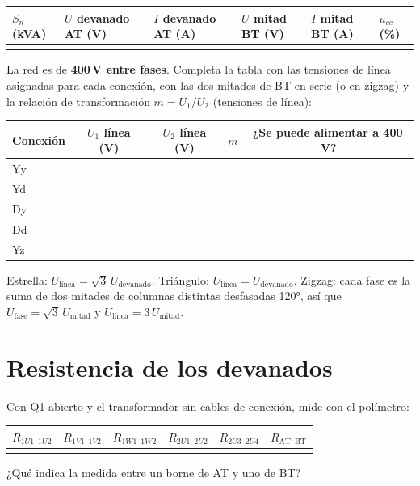 \documentclass[11pt,a4paper]{article}
\begin{document}
\begin{tabularx}{\textwidth}{|X|X|X|X|X|X|}
  \hline
  $S_n$ (kVA) & $U$ devanado AT (V) & $I$ devanado AT (A) & $U$ mitad BT (V) & $I$ mitad BT (A) & $u_{cc}$ (\%) \\ \hline
  & & & & & \\[6pt] \hline
\end{tabularx}

La red es de \textbf{400\,V entre fases}. Completa la tabla con las tensiones de línea asignadas para cada conexión, con las dos mitades de BT en serie (o en zigzag) y la relación de transformación $m = U_{1}/U_{2}$ (tensiones de línea):

\begin{tabularx}{\textwidth}{|l|C|C|C|C|}
  \hline
  Conexión & $U_1$ línea (V) & $U_2$ línea (V) & $m$ & ¿Se puede alimentar a 400\,V? \\ \hline
  Yy & & & & \\ \hline
  Yd & & & & \\ \hline
  Dy & & & & \\ \hline
  Dd & & & & \\ \hline
  Yz & & & & \\ \hline
\end{tabularx}

\begin{nota}
  Estrella: $U_\text{línea} = \sqrt3\,U_\text{devanado}$. Triángulo: $U_\text{línea} = U_\text{devanado}$. Zigzag: cada fase es la suma de dos mitades de columnas distintas desfasadas 120°, así que $U_\text{fase} = \sqrt3\,U_\text{mitad}$ y $U_\text{línea} = 3\,U_\text{mitad}$.
\end{nota}

\section{Resistencia de los devanados}
Con Q1 abierto y el transformador sin cables de conexión, mide con el polímetro:

\begin{tabularx}{\textwidth}{|C|C|C|C|C|C|}
  \hline
  $R_{1U1\text{–}1U2}$ & $R_{1V1\text{–}1V2}$ & $R_{1W1\text{–}1W2}$ & $R_{2U1\text{–}2U2}$ & $R_{2U3\text{–}2U4}$ & $R_\text{AT–BT}$ \\ \hline
  & & & & & \\[6pt] \hline
\end{tabularx}

¿Qué indica la medida entre un borne de AT y uno de BT?
\end{document}

